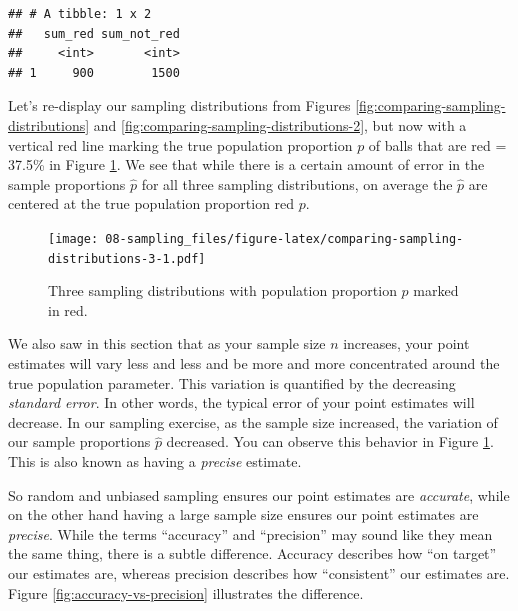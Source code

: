 \documentclass[
]{book}
\newenvironment{Shaded}{\begin{snugshade}}{\end{snugshade}}
\newcommand{\DataTypeTok}[1]{\textcolor[rgb]{0.13,0.29,0.53}{#1}}
\newcommand{\KeywordTok}[1]{\textcolor[rgb]{0.13,0.29,0.53}{\textbf{#1}}}
\newcommand{\NormalTok}[1]{#1}
\newcommand{\OperatorTok}[1]{\textcolor[rgb]{0.81,0.36,0.00}{\textbf{#1}}}
\newcommand{\StringTok}[1]{\textcolor[rgb]{0.31,0.60,0.02}{#1}}
\begin{document}
\begin{Shaded}
\end{Shaded}

\begin{verbatim}
## # A tibble: 1 x 2
##   sum_red sum_not_red
##     <int>       <int>
## 1     900        1500
\end{verbatim}

Let's re-display our sampling distributions from Figures \ref{fig:comparing-sampling-distributions} and \ref{fig:comparing-sampling-distributions-2}, but now with a vertical red line marking the true population proportion \(p\) of balls that are red = 37.5\% in Figure \ref{fig:comparing-sampling-distributions-3}. We see that while there is a certain amount of error in the sample proportions \(\widehat{p}\) for all three sampling distributions, on average the \(\widehat{p}\) are centered at the true population proportion red \(p\).

\begin{figure}
\centering
\texttt{[image: 08-sampling\_files/figure-latex/comparing-sampling-distributions-3-1.pdf]}
\caption{\label{fig:comparing-sampling-distributions-3}Three sampling distributions with population proportion \(p\) marked in red.}
\end{figure}

We also saw in this section that as your sample size \(n\) increases, your point estimates will vary less and less and be more and more concentrated around the true population parameter. This variation is quantified by the decreasing \emph{standard error}. In other words, the typical error of your point estimates will decrease. In our sampling exercise, as the sample size increased, the variation of our sample proportions \(\widehat{p}\) decreased. You can observe this behavior in Figure \ref{fig:comparing-sampling-distributions-3}. This is also known as having a \emph{precise} estimate.

So random and unbiased sampling ensures our point estimates are \emph{accurate}, while on the other hand having a large sample size ensures our point estimates are \emph{precise}. While the terms ``accuracy'' and ``precision'' may sound like they mean the same thing, there is a subtle difference. Accuracy describes how ``on target'' our estimates are, whereas precision describes how ``consistent'' our estimates are. Figure \ref{fig:accuracy-vs-precision} illustrates the difference.
\end{document}
